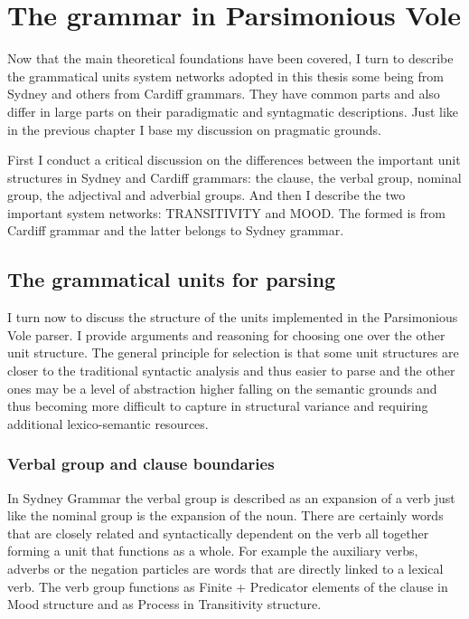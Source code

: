 \chapter{The grammar in Parsimonious Vole}
\label{ch:the-grammar}

Now that the main theoretical foundations have been covered, I turn to describe the grammatical units  system networks adopted in this thesis some being from Sydney and others from Cardiff grammars. They have common parts and also differ in large parts on their paradigmatic and syntagmatic descriptions. Just like in the previous chapter I base my discussion on pragmatic grounds.

First I conduct a critical discussion on the differences between the important unit structures in Sydney and Cardiff grammars: the clause, the verbal group, nominal group, the adjectival and adverbial groups.
And then I describe the two important system networks: TRANSITIVITY  and MOOD. The formed is from Cardiff grammar and the latter belongs to Sydney grammar. 


\section{The grammatical units for parsing}
\label{sec:discussion-unit-classes}

I turn now to discuss the structure of the units implemented in the Parsimonious Vole parser. I provide arguments and reasoning for choosing one over the other unit structure. The general principle for selection is that some unit structures are closer to the traditional syntactic analysis and thus easier to parse and the other ones may be a level of abstraction higher falling on the semantic grounds and thus becoming more difficult to capture in structural variance and requiring additional lexico-semantic resources.


\subsection{Verbal group and clause boundaries}
\label{sec:verbal-grpoup-and-clause-division}
In Sydney Grammar the verbal group is described as an expansion of a verb just like the nominal group is the expansion of the noun\citep[396]{Halliday2013}. There are certainly words that are closely related and syntactically dependent on the verb all together forming a unit that functions as a whole. For example the auxiliary verbs, adverbs or the negation particles are words that are directly linked to a lexical verb. The verb group functions as Finite + Predicator elements of the clause in Mood structure and as Process in Transitivity structure. 

